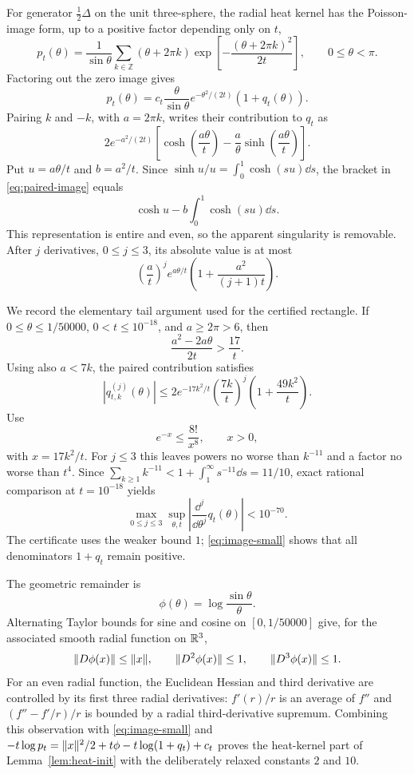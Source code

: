 For generator $\frac12\Delta$ on the unit three-sphere, the radial heat kernel
has the Poisson-image form, up to a positive factor depending only on $t$,
\begin{equation}\label{eq:poisson-image}
 p_t(\theta)=\frac1{\sin\theta}
 \sum_{k\in\mathbb Z}(\theta+2\pi k)
 \exp\left[-\frac{(\theta+2\pi k)^2}{2t}\right],
 \qquad 0\le\theta<\pi.
\end{equation}
Factoring out the zero image gives
\[
 p_t(\theta)=c_t\frac{\theta}{\sin\theta}
 e^{-\theta^2/(2t)}(1+q_t(\theta)).
\]
Pairing $k$ and $-k$, with $a=2\pi k$, writes their contribution to $q_t$ as
\begin{equation}\label{eq:paired-image}
 2e^{-a^2/(2t)}
 \left[\cosh\left(\frac{a\theta}{t}\right)
 -\frac a\theta\sinh\left(\frac{a\theta}{t}\right)\right].
\end{equation}
Put $u=a\theta/t$ and $b=a^2/t$.  Since
$\sinh u/u=\int_0^1\cosh(su)\dd s$, the bracket in
\eqref{eq:paired-image} equals
\[
 \cosh u-b\int_0^1\cosh(su)\dd s.
\]
This representation is entire and even, so the apparent singularity is
removable.  After $j$ derivatives, $0\le j\le3$, its absolute value is at most
\[
 \left(\frac at\right)^j e^{a\theta/t}
 \left(1+\frac{a^2}{(j+1)t}\right).
\]

We record the elementary tail argument used for the certified rectangle.  If
$0\le\theta\le1/50000$, $0<t\le10^{-18}$, and $a\ge2\pi>6$, then
\[
 \frac{a^2-2a\theta}{2t}>\frac{17}{t}.
\]
Using also $a<7k$, the paired contribution satisfies
\[
 |q_{t,k}^{(j)}(\theta)|
 \le 2e^{-17k^2/t}\left(\frac{7k}{t}\right)^j
 \left(1+\frac{49k^2}{t}\right).
\]
Use
\[
 e^{-x}\le\frac{8!}{x^8},\qquad x>0,
\]
with $x=17k^2/t$.  For $j\le3$ this leaves powers no worse than
$k^{-11}$ and a factor no worse than $t^4$.  Since
$\sum_{k\ge1}k^{-11}<1+\int_1^\infty s^{-11}\dd s=11/10$,
exact rational comparison at $t=10^{-18}$ yields
\begin{equation}\label{eq:image-small}
 \max_{0\le j\le3}\sup_{\theta,t}
 \left|\frac{\dd^j}{\dd\theta^j}q_t(\theta)\right|<10^{-70}.
\end{equation}
The certificate uses the weaker bound $1$; \eqref{eq:image-small} shows that
all denominators $1+q_t$ remain positive.

The geometric remainder is
\[
 \phi(\theta)=\log\frac{\sin\theta}{\theta}.
\]
Alternating Taylor bounds for sine and cosine on
$[0,1/50000]$ give, for the associated smooth radial function on $\mathbb R^3$,
\[
 \lVert D\phi(x)\rVert\le\lVert x\rVert,\qquad
 \lVert D^2\phi(x)\rVert\le1,\qquad
 \lVert D^3\phi(x)\rVert\le1.
\]
For an even radial function, the Euclidean Hessian and third derivative are
controlled by its first three radial derivatives: $f'(r)/r$ is an average of
$f''$ and $(f''-f'/r)/r$ is bounded by a radial third-derivative supremum.
Combining this observation with \eqref{eq:image-small} and
$-t\log p_t=\lVert x\rVert^2/2+t\phi-t\log(1+q_t)+c_t$ proves the heat-kernel part
of Lemma~\ref{lem:heat-init} with the deliberately relaxed constants $2$ and
$10$.

